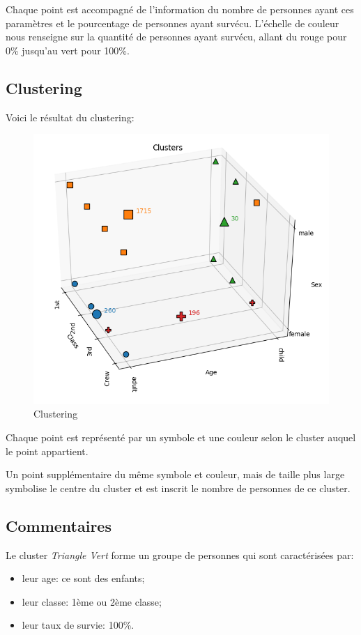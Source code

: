 \documentclass[11pt, a4paper]{article}
\begin{document}
Chaque point est accompagné de l'information du nombre de personnes ayant ces paramètres et
le pourcentage de personnes ayant survécu.
L'échelle de couleur nous renseigne sur la quantité de personnes ayant survécu,
allant du rouge pour 0\% jusqu'au vert pour 100\%.

\newpage

\subsection{Clustering}

Voici le résultat du clustering:

\begin{figure}[H]
    \begin{center}
        \includegraphics[width=.8\textwidth]{ex1_clusters}
    \end{center}
    \caption{Clustering}
    \label{Clustering}
\end{figure}

Chaque point est représenté par un symbole et une couleur selon le cluster auquel le point appartient.

Un point supplémentaire du même symbole et couleur,
mais de taille plus large symbolise le centre du cluster et est inscrit le nombre de personnes de ce cluster.

\subsection{Commentaires}

Le cluster \textit{Triangle Vert} forme un groupe de personnes qui sont caractérisées par:
\begin{itemize}
    \item leur age: ce sont des enfants;
    \item leur classe: 1ème ou 2ème classe;
    \item leur taux de survie: 100\%. \\
\end{itemize}
\end{document}
